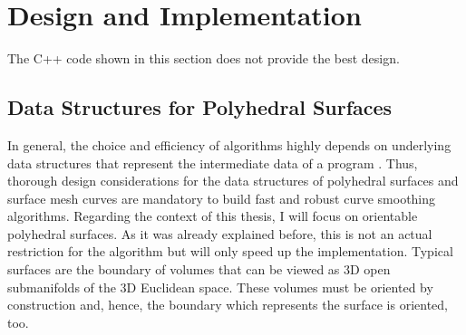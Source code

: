 \documentclass{stdlocal}
\begin{document}
\section{Design and Implementation} %
\label{sec:design}



The C++ code shown in this section does not provide the best design.

\subsection{Data Structures for Polyhedral Surfaces} %
\label{sub:polyhedral_surface_data_structure}

  In general, the choice and efficiency of algorithms highly depends on underlying data structures that represent the intermediate data of a program \autocite{knuth1997,mehlhorn2008,smed2006}.
  Thus, thorough design considerations for the data structures of polyhedral surfaces and surface mesh curves are mandatory to build fast and robust curve smoothing algorithms.
  Regarding the context of this thesis, I will focus on orientable polyhedral surfaces.
  As it was already explained before, this is not an actual restriction for the algorithm but will only speed up the implementation.
  Typical surfaces are the boundary of volumes that can be viewed as 3D open submanifolds of the 3D Euclidean space.
  These volumes must be oriented by construction and, hence, the boundary which represents the surface is oriented, too.
\end{document}
